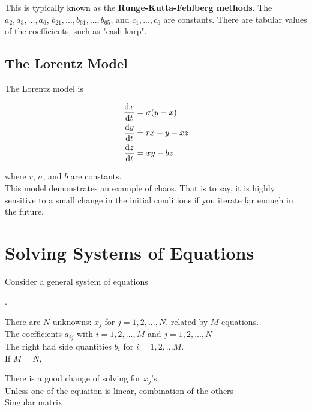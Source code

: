 \documentclass[]{article}
\begin{document}
This is typically known as the \textbf{Runge-Kutta-Fehlberg methods}. The $a_2, a_3, ..., a_6$, $b_{21}, ..., b_{61}, ..., b_{65}$, and $c_1, ..., c_6$ are constants. There are tabular values of the coefficients, such as "cash-karp".\\

\subsection{The Lorentz Model}\bigbreak

The Lorentz model is

\begin{align*}
	\dv{x}{t} &= \sigma (y-x)\\
	\dv{y}{t} &= rx-y-xz\\
	\dv{z}{t} &= xy - bz
\end{align*}

where $r$, $\sigma$, and $b$ are constants.\\

This model demonstrates an example of chaos. That is to say, it is highly sensitive to a small change in the initial conditions if you iterate far enough in the future.\\


\section{Solving Systems of Equations}\bigbreak\bigbreak

Consider a general system of equations

\begin{center}
	\sysdelim.
\end{center}\bigbreak

There are $N$ unknowns: $x_j$ for $j=1, 2, ..., N$, related by $M$ equations. \\

The coefficients $a_{ij}$ with $i=1, 2, ..., M$ and $j=1, 2, ..., N$\\
The right had side quantities $b_i$ for $i=1, 2,...M$.\\


If $M = N$,
\begin{outline}
	\1 There is a good change of solving for $x_j$'s.\\
	\1 Unless one of the equaiton is linear, combination of the others\\
	\1 Singular matrix
\end{outline}\bigbreak
\end{document}
